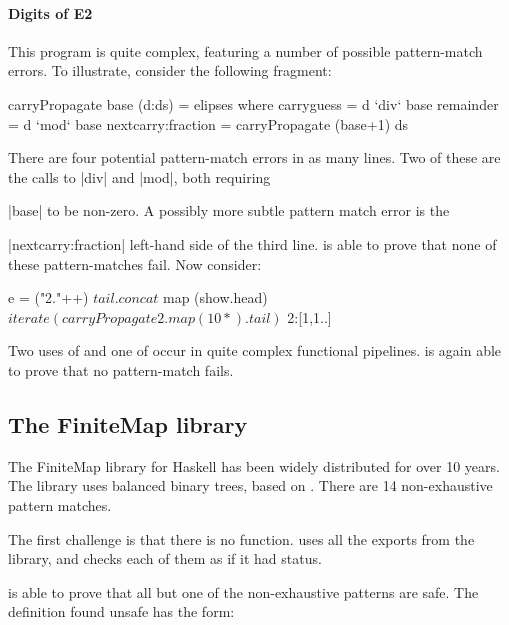 \paragraph{Digits of E2}

This program is quite complex, featuring a number of possible pattern-match errors. To illustrate, consider the following fragment:

\begin{code}
carryPropagate base (d:ds) = elipses
  where  carryguess = d `div` base
         remainder = d `mod` base
         nextcarry:fraction = carryPropagate (base+1) ds
\end{code}

\noindent There are four potential pattern-match errors in as many lines. Two of these are the calls to |div| and |mod|, both requiring \ignore|base| to be non-zero. A possibly more subtle pattern match error is the \ignore|nextcarry:fraction| left-hand side of the third line. \catch{} is able to prove that none of these pattern-matches fail. Now consider:

\begin{code}
e =  ("2."++) $
     tail . concat $
     map (show.head) $
     iterate (carryPropagate 2 . map (10*) . tail) $
     2:[1,1..]
\end{code}

\noindent Two uses of  and one of  occur in quite complex functional pipelines. \catch{} is again able to prove that no pattern-match fails.

\subsection{The FiniteMap library}
\label{sec:finitemap}

The FiniteMap library for Haskell has been widely distributed for over 10 years. The library uses balanced binary trees, based on \citep{adams:sets}. There are 14 non-exhaustive pattern matches.

The first challenge is that there is no  function. \catch{} uses all the exports from the library, and checks each of them as if it had  status.

\catch{} is able to prove that all but one of the non-exhaustive patterns are safe. The definition found unsafe has the form:

\begin{comment}
\begin{code}
data Branch a b = Branch a b
\end{code}
\end{comment}

